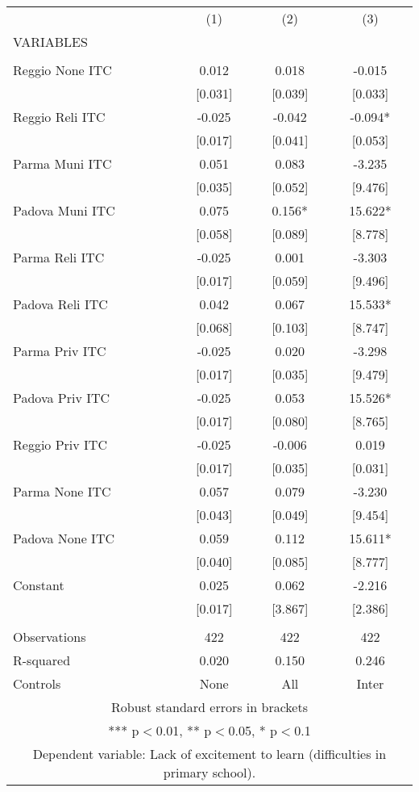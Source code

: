 \begin{tabular}{lccc} \hline
 & (1) & (2) & (3) \\
VARIABLES &  &  &  \\ \hline
 &  &  &  \\
Reggio None ITC & 0.012 & 0.018 & -0.015 \\
 & [0.031] & [0.039] & [0.033] \\
Reggio Reli ITC & -0.025 & -0.042 & -0.094* \\
 & [0.017] & [0.041] & [0.053] \\
Parma Muni ITC & 0.051 & 0.083 & -3.235 \\
 & [0.035] & [0.052] & [9.476] \\
Padova Muni ITC & 0.075 & 0.156* & 15.622* \\
 & [0.058] & [0.089] & [8.778] \\
Parma Reli ITC & -0.025 & 0.001 & -3.303 \\
 & [0.017] & [0.059] & [9.496] \\
Padova Reli ITC & 0.042 & 0.067 & 15.533* \\
 & [0.068] & [0.103] & [8.747] \\
Parma Priv ITC & -0.025 & 0.020 & -3.298 \\
 & [0.017] & [0.035] & [9.479] \\
Padova Priv ITC & -0.025 & 0.053 & 15.526* \\
 & [0.017] & [0.080] & [8.765] \\
Reggio Priv ITC & -0.025 & -0.006 & 0.019 \\
 & [0.017] & [0.035] & [0.031] \\
Parma None ITC & 0.057 & 0.079 & -3.230 \\
 & [0.043] & [0.049] & [9.454] \\
Padova None ITC & 0.059 & 0.112 & 15.611* \\
 & [0.040] & [0.085] & [8.777] \\
Constant & 0.025 & 0.062 & -2.216 \\
 & [0.017] & [3.867] & [2.386] \\
 &  &  &  \\
Observations & 422 & 422 & 422 \\
R-squared & 0.020 & 0.150 & 0.246 \\
 Controls & None & All & Inter \\ \hline
\multicolumn{4}{c}{ Robust standard errors in brackets} \\
\multicolumn{4}{c}{ *** p$<$0.01, ** p$<$0.05, * p$<$0.1} \\
\multicolumn{4}{c}{ Dependent variable: Lack of excitement to learn (difficulties in primary school).} \\
\end{tabular}
